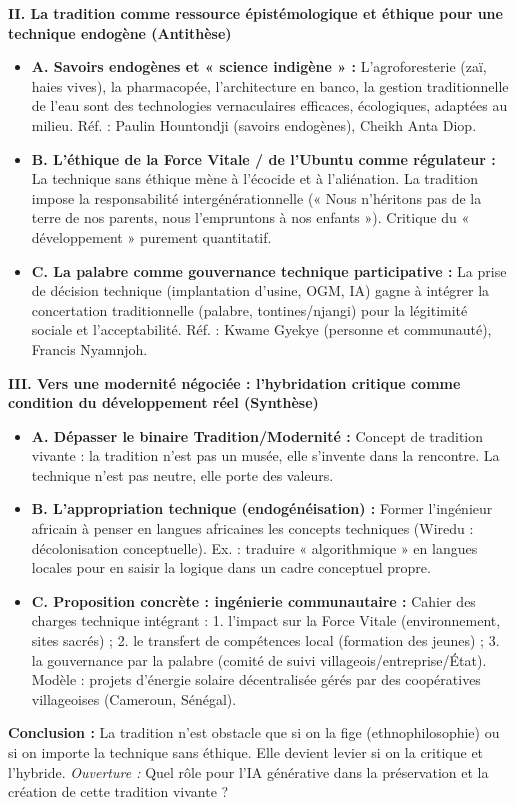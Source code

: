 \documentclass[11pt]{article}
\newcommand{\cle}[1]{{\popxbold\color{popdark}#1}}
\begin{document}
\begin{exoresolu}
\textbf{II. La tradition comme ressource épistémologique et éthique pour une technique endogène (Antithèse)}
\begin{itemize}
    \item \textbf{A. Savoirs endogènes et « science indigène » :} L'agroforesterie (zaï, haies vives), la pharmacopée, l'architecture en banco, la gestion traditionnelle de l'eau sont des \cle{technologies vernaculaires} efficaces, écologiques, adaptées au milieu. Réf. : Paulin Hountondji (savoirs endogènes), Cheikh Anta Diop.
    \item \textbf{B. L'éthique de la \cle{Force Vitale} / de l'\cle{Ubuntu} comme régulateur :} La technique sans éthique mène à l'écocide et à l'aliénation. La tradition impose la \cle{responsabilité intergénérationnelle} (« Nous n'héritons pas de la terre de nos parents, nous l'empruntons à nos enfants »). Critique du « développement » purement quantitatif.
    \item \textbf{C. La \cle{palabre} comme gouvernance technique participative :} La prise de décision technique (implantation d'usine, OGM, IA) gagne à intégrer la \cle{concertation} traditionnelle (palabre, tontines/njangi) pour la légitimité sociale et l'acceptabilité. Réf. : Kwame Gyekye (personne et communauté), Francis Nyamnjoh.
\end{itemize}

\textbf{III. Vers une modernité négociée : l'hybridation critique comme condition du développement réel (Synthèse)}
\begin{itemize}
    \item \textbf{A. Dépasser le binaire Tradition/Modernité :} Concept de \cle{tradition vivante} : la tradition n'est pas un musée, elle s'invente dans la rencontre. La technique n'est pas neutre, elle porte des valeurs.
    \item \textbf{B. L'\cle{appropriation technique} (endogénéisation) :} Former l'ingénieur africain à \cle{penser en langues africaines} les concepts techniques (Wiredu : décolonisation conceptuelle). Ex. : traduire « algorithmique » en langues locales pour en saisir la logique dans un cadre conceptuel propre.
    \item \textbf{C. Proposition concrète : \cle{ingénierie communautaire} :} Cahier des charges technique intégrant : 1. l'impact sur la \cle{Force Vitale} (environnement, sites sacrés) ; 2. le \cle{transfert de compétences} local (formation des jeunes) ; 3. la \cle{gouvernance par la palabre} (comité de suivi villageois/entreprise/État). Modèle : projets d'énergie solaire décentralisée gérés par des coopératives villageoises (Cameroun, Sénégal).
\end{itemize}

\textbf{Conclusion :} La tradition n'est obstacle que si on la fige (ethnophilosophie) ou si on importe la technique sans éthique. Elle devient levier si on la \cle{critique} et l'\cle{hybride}. \emph{Ouverture :} Quel rôle pour l'IA générative dans la préservation et la création de cette tradition vivante ?
\end{exoresolu}
\end{document}
